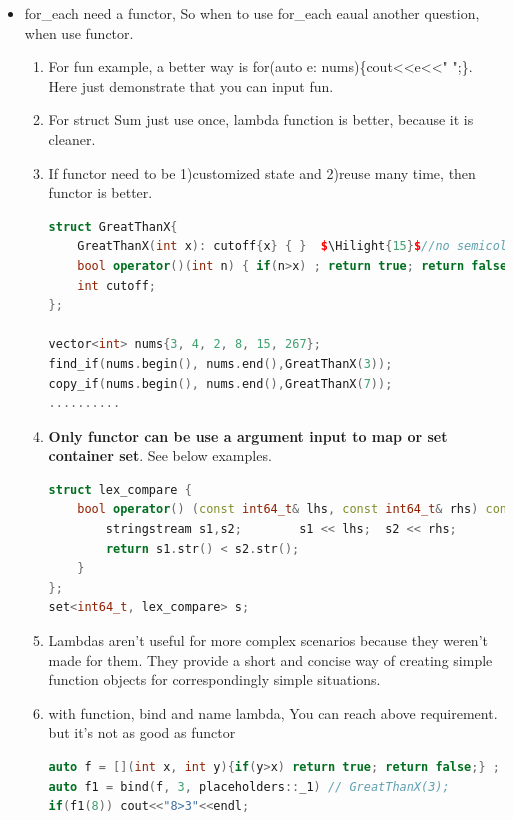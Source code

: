 \documentclass[a4paper,12pt,twoside]{book}
\newcommand{\Hilight}[1]{\makebox[0pt][l]{\color{yellow}\rule[-3pt]{#1em}{11pt}}}
\begin{document}
\begin{itemize}
\item for\_each need a functor, So when to use for\_each eaual another question, when use functor.
\begin{enumerate}
\item For fun example, a better way is for(auto e: nums)\{cout<<e<<" ";\}. Here just demonstrate that  you can input fun.
\item For struct Sum just use once, lambda function is better, because it is cleaner.
\item If functor need to be 1)customized state and 2)reuse many time, then functor is better.
\begin{lstlisting}[frame=single, language=c++, mathescape=true]
struct GreatThanX{
    GreatThanX(int x): cutoff{x} { }  $\Hilight{15}$//no semicolon here
    bool operator()(int n) { if(n>x) ; return true; return false; }
    int cutoff;
};

vector<int> nums{3, 4, 2, 8, 15, 267};
find_if(nums.begin(), nums.end(),GreatThanX(3));
copy_if(nums.begin(), nums.end(),GreatThanX(7));
..........
\end{lstlisting}
\item \textbf{Only functor can be use a argument input to map or set container set}. See below examples.

\begin{lstlisting}[frame=single, language=c++, mathescape=true]
struct lex_compare {
    bool operator() (const int64_t& lhs, const int64_t& rhs) const{
        stringstream s1,s2;        s1 << lhs;  s2 << rhs;
        return s1.str() < s2.str();
    }
};
set<int64_t, lex_compare> s;
\end{lstlisting}


\item Lambdas aren't useful for more complex scenarios because they weren't made for them. They provide a short and concise way of creating simple function objects for correspondingly simple situations.

\item with function, bind and name lambda, You can reach above requirement.  but it's not as good as functor
\begin{lstlisting}[frame=single, language=c++, mathescape=true]
auto f = [](int x, int y){if(y>x) return true; return false;} ;
auto f1 = bind(f, 3, placeholders::_1) // GreatThanX(3);
if(f1(8)) cout<<"8>3"<<endl;
\end{lstlisting}

\end{enumerate}

\end{itemize}
\end{document}
